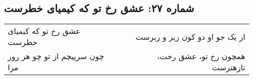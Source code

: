 \begin{center}
\section*{شماره ۲۷: عشق رخ تو که کیمیای خطرست}
\label{sec:027}
\begin{longtable}{l p{0.5cm} r}
عشق رخ تو که کیمیای خطرست
&&
از یک جو او دو کون زیر و زبرست
\\
چون سرپیچم از تو چو هر روز مرا
&&
همچون رخ تو، عشق رخت، تازهترست
\\
\end{longtable}
\end{center}
